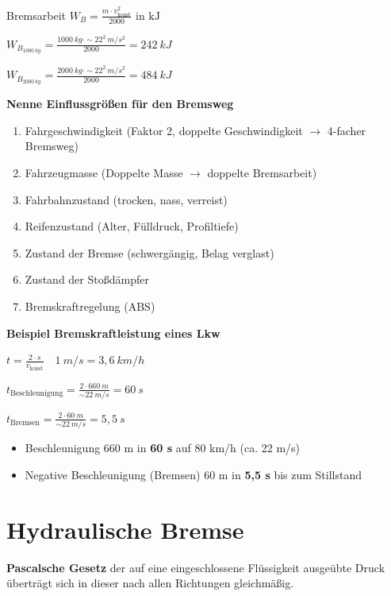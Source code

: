 Bremsarbeit
$\boxed{W_B = \frac{m \cdot v^2_\text{konst}}{2000}} \text{ in kJ}$

$W_{B_{1000~kg}} = \frac{1000~kg \cdot \sim 22^2~m/s^2}{2000} = 242~kJ$

$W_{B_{2000~kg}} = \frac{2000~kg \cdot \sim 22^2~m/s^2}{2000} = 484~kJ$

\newpage

\textbf{Nenne Einflussgrößen für den Bremsweg}

\begin{enumerate}
\item
  Fahrgeschwindigkeit (Faktor 2, doppelte Geschwindigkeit $\to$
  4-facher Bremsweg)
\item
  Fahrzeugmasse (Doppelte Masse $\to$ doppelte Bremsarbeit)
\item
  Fahrbahnzustand (trocken, nass, verreist)
\item
  Reifenzustand (Alter, Fülldruck, Profiltiefe)
\item
  Zustand der Bremse (schwergängig, Belag verglast)
\item
  Zustand der Stoßdämpfer
\item
  Bremskraftregelung (ABS)
\end{enumerate}

\textbf{Beispiel Bremskraftleistung eines Lkw}

$\boxed{t = \frac{2 \cdot s}{v_\text{konst}}} \quad \boxed{1~m/s = 3,6~km/h}$

$t_\text{Beschleunigung} = \frac{2 \cdot 660~m}{\sim 22~m/s} = 60~s$

$t_\text{Bremsen} = \frac{2 \cdot 60~m}{\sim 22~m/s} = 5,5~s$

\begin{itemize}
\item
  Beschleunigung 660 m in \textbf{60 s} auf 80 km/h (ca. 22 m/s)
\item
  Negative Beschleunigung (Bremsen) 60 m in \textbf{5,5 s} bis zum
  Stillstand
\end{itemize}

\newpage

\section{Hydraulische Bremse}\label{hydraulische-bremse}

\textbf{Pascalsche Gesetz} der auf eine eingeschlossene Flüssigkeit
ausgeübte Druck überträgt sich in dieser nach allen Richtungen
gleichmäßig.

